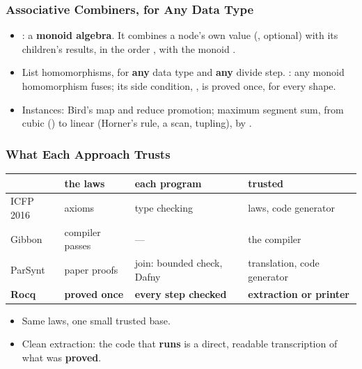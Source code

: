 \begin{frame*}
  \frametitle{Associative Combiners, for Any Data Type}
  \small
  \begin{itemize}
    \item {}: a \textbf{monoid algebra}. It combines a node's own
      value (, optional) with its children's results, in the
      order , with the monoid .
    \item List homomorphisms, for \textbf{any} data type and
      \textbf{any} divide step. : any monoid
      homomorphism fuses; its side condition, , is proved
      once, for every shape.
    \item Instances: Bird's map and reduce promotion; maximum segment sum,
      from cubic () to linear (Horner's
      rule, a scan, tupling), by .
  \end{itemize}
\end{frame*}

\begin{frame}
  \frametitle{What Each Approach Trusts}
  \begin{center}
    \small
    \renewcommand\arraystretch{1.35}
    \begin{tabular}{@{}llll@{}}
      & \textbf{the laws} & \textbf{each program} & \textbf{trusted} \\
      \hline
      ICFP 2016 & axioms & type checking & laws, code generator \\
      Gibbon & compiler passes & --- & the compiler \\
      ParSynt & paper proofs & join: bounded check, Dafny &
        translation, code generator \\
      \textbf{Rocq} & \textbf{proved once} & \textbf{every step checked} &
        \textbf{extraction or printer} \\
    \end{tabular}
  \end{center}
  \begin{itemize}[<+->]
    \item Same laws, one small trusted base.
    \item Clean extraction: the code that \textbf{runs} is a direct,
      readable transcription of what was \textbf{proved}.
  \end{itemize}
  \ongoingtag
\end{frame}

